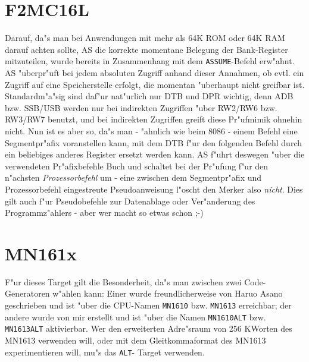 \documentclass[12pt,a4paper,twoside]{report}
\newcommand{\tty}[1]{{\tt #1}}
\newcommand{\asname}{AS}
\begin{document}

\section{F2MC16L}

Darauf, da"s man bei Anwendungen mit mehr als 64K ROM oder 64K RAM darauf
achten sollte, \asname{} die korrekte momentane Belegung der Bank-Register
mitzuteilen, wurde bereits in Zusammenhang mit dem {\tt ASSUME}-Befehl
erw"ahnt.  \asname{} "uberpr"uft bei jedem absoluten Zugriff anhand dieser
Annahmen, ob evtl. ein Zugriff auf eine Speicherstelle erfolgt, die
momentan "uberhaupt nicht greifbar ist.  Standardm"a"sig sind daf"ur
nat"urlich nur DTB und DPR wichtig, denn ADB bzw. SSB/USB werden nur bei
indirekten Zugriffen "uber RW2/RW6 bzw. RW3/RW7 benutzt, und bei
indirekten Zugriffen greift diese Pr"ufmimik ohnehin nicht.  Nun ist es
aber so, da"s man - "ahnlich wie beim 8086 - einem Befehl eine
Segmentpr"afix voranstellen kann, mit dem DTB f"ur den folgenden Befehl
durch ein beliebiges anderes Register ersetzt werden kann.  \asname{} f"uhrt
deswegen "uber die verwendeten Pr"afixbefehle Buch und schaltet bei der
Pr"ufung f"ur den n"achsten {\em Prozessorbefehl} um - eine zwischen dem
Segmentpr"afix und Prozessorbefehl eingestreute Pseudoanweisung l"oscht
den Merker also {\em nicht}.  Dies gilt auch f"ur Pseudobefehle zur
Datenablage oder Ver"anderung des Programmz"ahlers - aber wer macht so
etwas schon ;-)


\section{MN161x}

F"ur dieses Target gilt die Besonderheit, da"s man zwischen zwei
Code-Generatoren w"ahlen kann: Einer wurde freundlicherweise von Haruo Asano
geschrieben und ist "uber die CPU-Namen \tty{MN1610} bzw. \tty{MN1613}
erreichbar; der andere wurde von mir erstellt und ist "uber die Namen
\tty{MN1610ALT} bzw. \tty{MN1613ALT} aktivierbar.  Wer den erweiterten
Adre"sraum von 256 KWorten des MN1613 verwenden will, oder mit dem
Gleitkommaformat des MN1613 experimentieren will, mu"s das \tty{ALT}-
Target verwenden.

\end{document}
